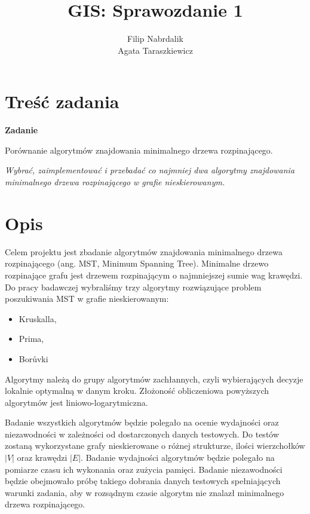 \documentclass[a4paper, 10pt]{article}
\begin{document}



\newcommand{\ang}[1]{(ang. {\em #1}\/)}
\newcommand{\e}[1]{{\em #1}\/}




\title{GIS: Sprawozdanie 1}
\author{Filip Nabrdalik\\ Agata Taraszkiewicz}
\date{} 
\maketitle 

\section{Treść zadania}

{\bf{Zadanie}}

Porównanie algorytmów znajdowania minimalnego drzewa rozpinającego.

{\it Wybrać, zaimplementować i przebadać co najmniej dwa algorytmy znajdowania minimalnego drzewa rozpinającego w grafie nieskierowanym.} 


\section{Opis}


Celem projektu jest zbadanie algorytmów znajdowania minimalnego drzewa rozpinającego (ang. MST, Minimum Spanning Tree). Minimalne drzewo rozpinające grafu jest drzewem rozpinającym o najmniejszej sumie wag krawędzi. 
Do pracy badawczej wybraliśmy trzy algorytmy rozwiązujące problem poszukiwania MST w grafie nieskierowanym:
\begin{itemize}
\item Kruskalla,
\item Prima,
\item Borůvki
\end{itemize}
Algorytmy należą do grupy algorytmów zachłannych, czyli wybierających decyzje lokalnie optymalną w danym kroku. Złożoność obliczeniowa powyższych algorytmów jest liniowo-logarytmiczna.

Badanie wszystkich algorytmów będzie polegało na ocenie wydajności oraz niezawodności w zależności od dostarczonych danych testowych. Do testów zostaną wykorzystane grafy nieskierowane o różnej strukturze, ilości wierzchołków $|V|$ oraz krawędzi $|E|$. Badanie wydajności algorytmów będzie polegało na pomiarze czasu ich wykonania oraz zużycia pamięci. Badanie niezawodności będzie obejmowało próbę takiego dobrania danych testowych spełniających warunki zadania, aby w rozsądnym czasie algorytm nie znalazł minimalnego drzewa rozpinającego.
\end{document}
